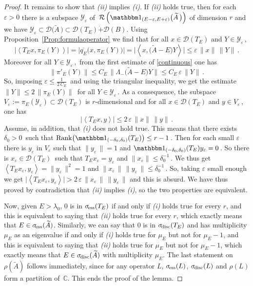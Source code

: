 \documentclass[12pt,reqno]{amsart}
\newcommand{\innerproduct}[2]{\left\langle #1, #2 \right\rangle}
\renewcommand{\(}{\left(}
\renewcommand{\)}{\right)}
\begin{document}
\begin{proof}
It remains to show that {\it (ii)} implies {\it (i)}. If {\it (ii)} holds true, then for each $\varepsilon>0$ there is a subspace $\mathcal Y_\varepsilon$ of $\,{\mathcal R}\left({\mathbbm 1}_{(E-\varepsilon,E+\varepsilon)}\big(\widetilde A\,\big)\right)$ of dimension $r$ and we have $\mathcal Y_\varepsilon\subset \mathcal D\big(\widetilde A\,\big)\subset \mathcal D(T_E)\dot{+}\mathcal D(B)$. Using Proposition~\ref{Prop:formulaoperator} we find that for all $x\in \mathcal D(T_E)$ and $Y\in \mathcal Y_\varepsilon\,$,
\[
\big|\innerproduct{T_E x}{\pi_E (Y)}\big|=\big|\overline{q_E}\big(x,\pi_E(Y)\big)\big|=\big|\innerproduct{x}{\big(\widetilde A-E\big)Y}\big|\le \varepsilon\,\|x\|\,\| Y\|\,.
\]
Moreover for all $Y\in \mathcal Y_\varepsilon\,,$ from the first estimate of \eqref{continuous} one has
\[
\big\| \pi'_E(Y)\big\|\le C_E\,\big\| \Lambda_-\big(\widetilde A-E\big)Y\big\|\le C_E\,\varepsilon\,\| Y\|\,.
\]
So, imposing $\varepsilon\le \frac1{2\,C_E}\,$ and using the triangular inequality, we get the estimate $\| Y\|\le 2\,\| \pi_E(Y)\|\,$ for all $Y\in \mathcal Y_\varepsilon\,$.
As a consequence, the subspace $V_\varepsilon:=\pi_E (\mathcal Y_\varepsilon)\subset \mathcal D(T_E)$ is $r$-dimensional and for all $x\in \mathcal D(T_E)$ and $y\in V_\varepsilon\,$, one has
\[
\left|\innerproduct{T_E x}{y}\right|\le 2\,\varepsilon\,\|x\|\,\| y\|\,.
\]
Assume, in addition, that {\it (i)} does not hold true. This means that there exists $\delta_0>0\,$ such that $\mathrm{Rank}\big({\mathbbm 1}_{(-\delta_0,\delta_0)}(T_E)\big) \le r-1\,$. Then for each small $\varepsilon$ there is $y_\varepsilon$ in $V_\varepsilon$ such that $\| y_\varepsilon\,\|=1$ and ${\mathbbm 1}_{(-\delta_0,\delta_0)}(T_E) y_\varepsilon=0\,$. So there is $x_\varepsilon\in \mathcal D(T_E)\,$ such that $T_E x_\varepsilon = y_\varepsilon$ and
$\|x_\varepsilon \| \le \delta_0^{-1}\,$. We thus get $\innerproduct{T_E x_\varepsilon}{y_\varepsilon}=\| y_\varepsilon\,\|^2=1$ and $\|x_\varepsilon\,\|\,\| y_\varepsilon\,\|\le \delta_0^{-1}\,$. So, taking $\varepsilon$ small enough we get $\big|\innerproduct{T_E x_\varepsilon}{y_\varepsilon}\big| > 2\,\varepsilon\,\|x_\varepsilon\,\|\,\| y_\varepsilon\,\|$ and this is absurd. We have thus proved by contradiction that {\it (ii)} implies {\it (i)}, so the two properties are equivalent.

Now, given $E>\lambda_0$, $0$ is in $\sigma_{\!\rm ess}(T_E)$ if and only if {\it (i)} holds true for every $r$, and this is equivalent to saying that {\it (ii)} holds true for every $r$, which exactly means that $E\in \sigma_{\!\rm ess}(\widetilde A)$. Similarly, we can say that $0$ is in $\sigma_{\!\rm disc}(T_E)$ and has multiplicity $\mu_E$ as an eigenvalue if and only if {\it (i)} holds true for $\mu_E$ but not for $\mu_E-1$, and this is equivalent to saying that {\it (ii)} holds true for $\mu_E$ but not for $\mu_E-1$, which exactly means that $E\in \sigma_{\!\rm disc}(\widetilde A)$ with multiplicity $\mu_E$. The last statement on $\rho(\widetilde A)$ follows immediately, since for any operator $L$, $\sigma_{\!\rm ess}(L)$, $\sigma_{\!\rm disc}(L)$ and $\rho(L)$ form a partition of $\,\mathbb{C}$. This ends the proof of the lemma.
\end{proof}
\end{document}

